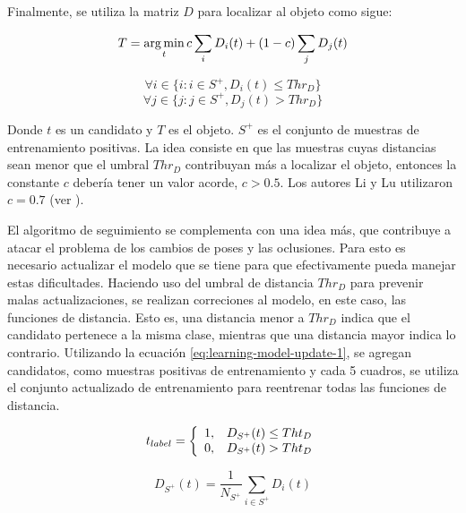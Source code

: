 Finalmente, se utiliza la matriz $D$ para localizar al objeto como sigue:

\begin{equation}
    T = \operatorname*{arg\,min}_{t} c \sum_{i} D_{i}(t) + (1 - c) \sum_{j} D_{j}(t)
\end{equation}

\begin{equation}
    \forall i \in \{i : i \in S^{+}, D_{i}(t) \leq Thr_{D} \}
\end{equation}
\begin{equation}
    \forall j \in \{j : j \in S^{+}, D_{j}(t) > Thr_{D} \}
\end{equation}

Donde $t$ es un candidato y $T$ es el objeto. $S^{+}$ es el
conjunto de muestras de entrenamiento positivas. La idea consiste en
que las muestras cuyas distancias sean menor que el umbral $Thr_{D}$
contribuyan más a localizar el objeto, entonces la constante $c$ debería tener
un valor acorde, $c > 0.5$. Los autores Li y Lu utilizaron $c = 0.7$ (ver
\cite{local-learning}).

El algoritmo de seguimiento se complementa con una idea más, que
contribuye a atacar el problema de los cambios de poses y las oclusiones.
Para esto es necesario actualizar el modelo que se tiene para
que efectivamente pueda manejar estas dificultades.
Haciendo uso del umbral de distancia $Thr_{D}$ para prevenir
malas actualizaciones, se realizan correciones al modelo,
en este caso, las funciones de distancia. Esto es, una distancia
menor a $Thr_{D}$ indica que el candidato pertenece a la misma clase,
mientras que una distancia mayor indica lo contrario. Utilizando
la ecuación \ref{eq:learning-model-update-1}, se agregan candidatos,
como muestras positivas de entrenamiento y cada 5 cuadros,
se utiliza el conjunto actualizado de entrenamiento para
reentrenar todas las funciones de distancia.

\begin{equation}
    \label{eq:learning-model-update-1}
    t_{label} = \left\{
                \begin{array}{l l}
                    1, & D_{S^{+}}(t) \leq Tht_{D}\\
                    0, & D_{S^{+}}(t) >  Tht_{D}
                \end{array} \right.
\end{equation}

\begin{equation}
    \label{eq:learning-model-update-2}
    D_{S^{+}}(t) = \dfrac{1}{N_{S^{+}}} \sum_{i \in S^{+}} D_{i}(t)
\end{equation}

